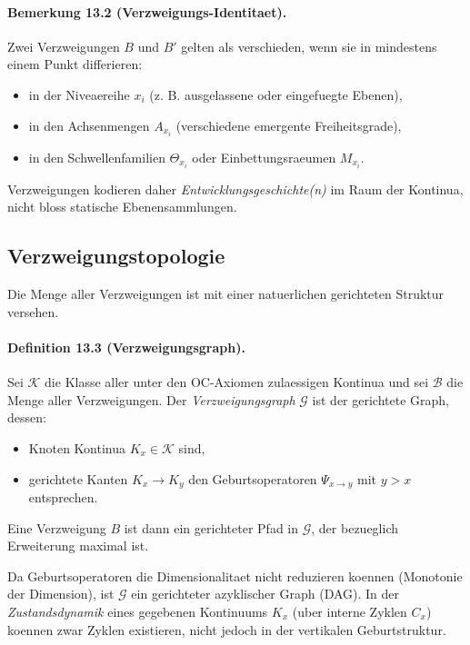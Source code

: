 \paragraph{Bemerkung 13.2 (Verzweigungs-Identitaet).}
Zwei Verzweigungen \(B\) und \(B'\) gelten als verschieden, wenn sie in
mindestens einem Punkt differieren:
\begin{itemize}
  \item in der Niveaereihe \(x_i\) (z. B. ausgelassene oder eingefuegte
        Ebenen),
  \item in den Achsenmengen \(A_{x_i}\) (verschiedene emergente Freiheitsgrade),
  \item in den Schwellenfamilien \(\Theta_{x_i}\) oder Einbettungsraeumen
        \(M_{x_i}\).
\end{itemize}
Verzweigungen kodieren daher \emph{Entwicklungsgeschichte(n)} im Raum der
Kontinua, nicht bloss statische Ebenensammlungen.

\subsection{Verzweigungstopologie}

Die Menge aller Verzweigungen ist mit einer natuerlichen gerichteten Struktur
versehen.

\paragraph{Definition 13.3 (Verzweigungsgraph).}
Sei \(\mathcal{K}\) die Klasse aller unter den OC-Axiomen zulaessigen
Kontinua und sei \(\mathcal{B}\) die Menge aller Verzweigungen. Der
\emph{Verzweigungsgraph} \(\mathcal{G}\) ist der gerichtete Graph, dessen:
\begin{itemize}
  \item Knoten Kontinua \(K_x\in\mathcal{K}\) sind,
  \item gerichtete Kanten \(K_x \to K_y\) den Geburtsoperatoren
        \(\Psi_{x\to y}\) mit \(y > x\) entsprechen.
\end{itemize}
Eine Verzweigung \(B\) ist dann ein gerichteter Pfad in \(\mathcal{G}\), der
bezueglich Erweiterung maximal ist.

Da Geburtsoperatoren die Dimensionalitaet nicht reduzieren koennen (Monotonie
der Dimension), ist \(\mathcal{G}\) ein gerichteter azyklischer Graph (DAG).
In der \emph{Zustandsdynamik} eines gegebenen Kontinuums \(K_x\) (uber interne
Zyklen \(C_x\)) koennen zwar Zyklen existieren, nicht jedoch in der
vertikalen Geburtstruktur.

